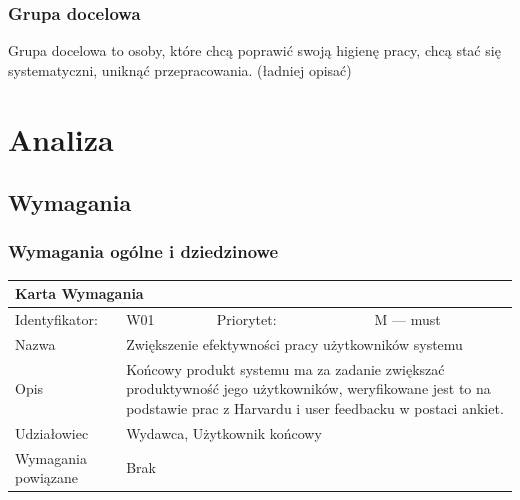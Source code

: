 \documentclass[a4paper,11pt]{report}
\begin{document}
\subsection {Grupa docelowa}
Grupa docelowa to osoby, które chcą poprawić swoją higienę pracy, chcą stać się systematyczni, uniknąć przepracowania. (ładniej opisać)
\chapter {Analiza}

\section {Wymagania}
\subsection {Wymagania ogólne i dziedzinowe}
		\begin{tabular}{|p{3cm}|p{2cm}|p{2cm}|p{6cm}|}
		\hline
		\multicolumn{4}{|p{12 cm}|}{Karta Wymagania}\\
		\hline
		Identyfikator: & W01 & Priorytet: & M — must\\
		\hline
		Nazwa & \multicolumn{3}{|p{10 cm}|}{Zwiększenie efektywności pracy użytkowników systemu}\\
		\hline
		Opis & \multicolumn{3}{|p{10 cm}|}{Końcowy produkt systemu ma za zadanie zwiększać produktywność jego użytkowników, weryfikowane jest to na podstawie prac z Harvardu i user feedbacku w postaci ankiet.}\\
		\hline
		Udziałowiec & \multicolumn{3}{|p{10 cm}|}{Wydawca, Użytkownik końcowy}\\
		\hline
		Wymagania powiązane & \multicolumn{3}{|p{10 cm}|}{Brak}\\
		\hline
		\end{tabular}\\
\end{document}
